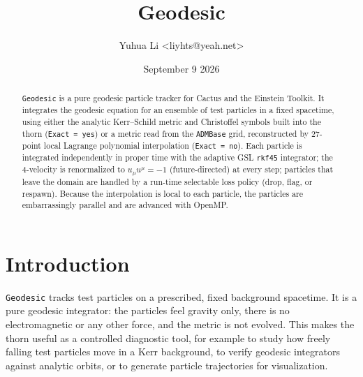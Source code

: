 \documentclass{article}
\begin{document}
\author{Yuhua Li \textless liyhts@yeah.net\textgreater}

\title{Geodesic}

\date{September 9 2026}

\maketitle



\begin{abstract}
\texttt{Geodesic} is a pure geodesic particle tracker for Cactus and the
Einstein Toolkit.  It integrates the geodesic equation for an ensemble of
test particles in a fixed spacetime, using either the analytic Kerr--Schild
metric and Christoffel symbols built into the thorn (\texttt{Exact = yes})
or a metric read from the \texttt{ADMBase} grid, reconstructed by 27-point
local Lagrange polynomial interpolation (\texttt{Exact = no}).  Each
particle is integrated independently in proper time with the adaptive
GSL \texttt{rkf45} integrator; the 4-velocity is renormalized to
$u_\mu u^\mu = -1$ (future-directed) at every step; particles that
leave the domain are handled by a run-time selectable loss policy
(drop, flag, or respawn).  Because the interpolation is local to
each particle, the particles are embarrassingly parallel and are
advanced with OpenMP.
\end{abstract}


\section{Introduction}

\texttt{Geodesic} tracks test particles on a prescribed, fixed background
spacetime.  It is a pure geodesic integrator: the particles feel gravity
only, there is no electromagnetic or any other force, and the metric is
not evolved.  This makes the thorn useful as a controlled diagnostic
tool, for example to study how freely falling test particles move in a
Kerr background, to verify geodesic integrators against analytic
orbits, or to generate particle trajectories for visualization.
\end{document}
